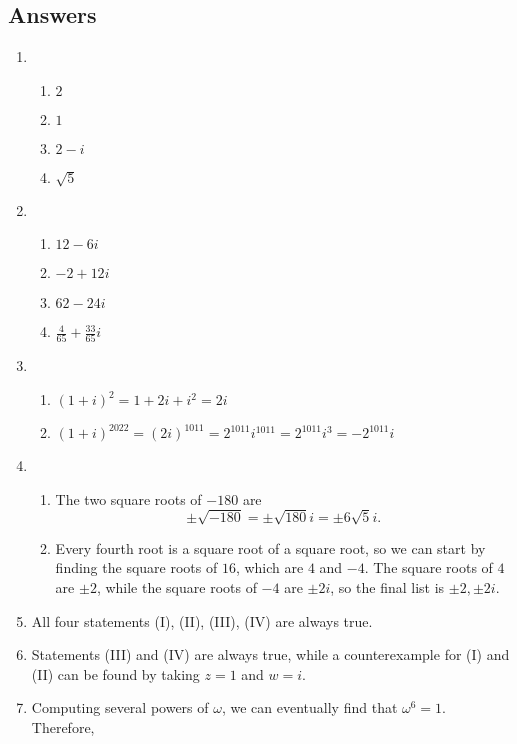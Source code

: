 \newpage
\subsection{Answers}

\begin{enumerate}
\item \begin{enumerate}
\item $2$
\item $1$
\item $2 - i$
\item $\sqrt{5}$
\end{enumerate}
\item \begin{enumerate}
\item $12 - 6i$
\item $-2 + 12i$
\item $62 - 24i$
\item $\frac{4}{65} + \frac{33}{65}i$
\end{enumerate}
\item \begin{enumerate}
\item $(1 + i)^2 = 1 + 2i + i^2 = \boxed{2i}$
\item $(1 + i)^{2022} = (2i)^{1011} = 2^{1011}i^{1011} = 2^{1011}i^3 = \boxed{-2^{1011}i}$
\end{enumerate}
\item \begin{enumerate}
\item The two square roots of $-180$ are
\begin{equation*}
\pm\sqrt{-180} = \pm\sqrt{180}i = \boxed{\pm 6\sqrt{5}i}.
\end{equation*}
\item Every fourth root is a square root of a square root, so we can start by finding the square roots of $16$, which are $4$ and $-4$. The square roots of $4$ are $\pm 2$, while the square roots of $-4$ are $\pm 2i$, so the final list is $\boxed{\pm 2, \pm 2i}$.
\end{enumerate}
\item All four statements (I), (II), (III), (IV) are always true.
\item Statements (III) and (IV) are always true, while a counterexample for (I) and (II) can be found by taking $z = 1$ and $w = i$.
\item Computing several powers of $\omega$, we can eventually find that $\omega^6 = 1$. Therefore,
\begin{equation*}

\end{equation*}
\end{enumerate}
